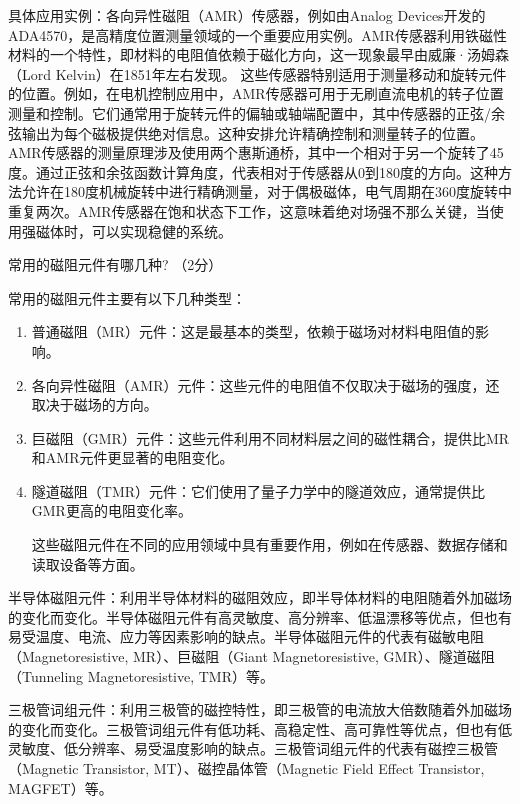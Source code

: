 \documentclass[dvipsnames, svgnames,a4paper,11pt]{article}
\begin{document}
	具体应用实例：各向异性磁阻（AMR）传感器，例如由Analog Devices开发的ADA4570，是高精度位置测量领域的一个重要应用实例。AMR传感器利用铁磁性材料的一个特性，即材料的电阻值依赖于磁化方向，这一现象最早由威廉·汤姆森（Lord Kelvin）在1851年左右发现。
	这些传感器特别适用于测量移动和旋转元件的位置。例如，在电机控制应用中，AMR传感器可用于无刷直流电机的转子位置测量和控制。它们通常用于旋转元件的偏轴或轴端配置中，其中传感器的正弦/余弦输出为每个磁极提供绝对信息。这种安排允许精确控制和测量转子的位置。
	AMR传感器的测量原理涉及使用两个惠斯通桥，其中一个相对于另一个旋转了45度。通过正弦和余弦函数计算角度，代表相对于传感器从0到180度的方向。这种方法允许在180度机械旋转中进行精确测量，对于偶极磁体，电气周期在360度旋转中重复两次。AMR传感器在饱和状态下工作，这意味着绝对场强不那么关键，当使用强磁体时，可以实现稳健的系统。
	
	\begin{question}
		常用的磁阻元件有哪几种? （2分）
	\end{question}
	常用的磁阻元件主要有以下几种类型：
	\begin{enumerate}
		\item 普通磁阻（MR）元件：这是最基本的类型，依赖于磁场对材料电阻值的影响。
		
		\item 各向异性磁阻（AMR）元件：这些元件的电阻值不仅取决于磁场的强度，还取决于磁场的方向。
		
		\item 巨磁阻（GMR）元件：这些元件利用不同材料层之间的磁性耦合，提供比MR和AMR元件更显著的电阻变化。
		
		\item 隧道磁阻（TMR）元件：它们使用了量子力学中的隧道效应，通常提供比GMR更高的电阻变化率。
		
		这些磁阻元件在不同的应用领域中具有重要作用，例如在传感器、数据存储和读取设备等方面。
	\end{enumerate}
	
	半导体磁阻元件：利用半导体材料的磁阻效应，即半导体材料的电阻随着外加磁场的变化而变化。半导体磁阻元件有高灵敏度、高分辨率、低温漂移等优点，但也有易受温度、电流、应力等因素影响的缺点。半导体磁阻元件的代表有磁敏电阻（Magnetoresistive, MR）、巨磁阻（Giant Magnetoresistive, GMR）、隧道磁阻（Tunneling Magnetoresistive, TMR）等。
	
	三极管词组元件：利用三极管的磁控特性，即三极管的电流放大倍数随着外加磁场的变化而变化。三极管词组元件有低功耗、高稳定性、高可靠性等优点，但也有低灵敏度、低分辨率、易受温度影响的缺点。三极管词组元件的代表有磁控三极管（Magnetic Transistor, MT）、磁控晶体管（Magnetic Field Effect Transistor, MAGFET）等。
	
\end{document}
